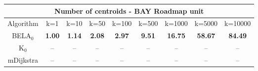 \begin{tabular}{c|cccccccc}\toprule
\multicolumn{9}{c}{Number of centroids - BAY Roadmap unit}\\ \midrule
Algorithm & k=1 & k=10 & k=50 & k=100 & k=500 & k=1000 & k=5000 & k=10000 \\ \midrule
BELA$_0$ & \textbf{1.00} & \textbf{1.14} & \textbf{2.08} & \textbf{2.97} & \textbf{9.51} & \textbf{16.75} & \textbf{58.67} & \textbf{84.49} \\
K$_0$ & -- & -- & -- & -- & -- & -- & -- & -- \\
mDijkstra & -- & -- & -- & -- & -- & -- & -- & -- \\ \bottomrule 
\end{tabular}
